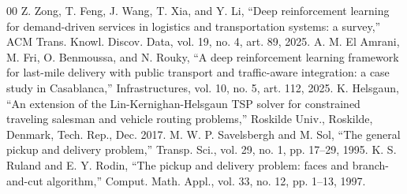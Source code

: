 \documentclass[conference]{IEEEtran}
\begin{document}
\begin{thebibliography}{00}
 Z. Zong, T. Feng, J. Wang, T. Xia, and Y. Li, ``Deep reinforcement learning for demand-driven services in logistics and transportation systems: a survey,'' ACM Trans. Knowl. Discov. Data, vol. 19, no. 4, art. 89, 2025.
 A. M. El Amrani, M. Fri, O. Benmoussa, and N. Rouky, ``A deep reinforcement learning framework for last-mile delivery with public transport and traffic-aware integration: a case study in Casablanca,'' Infrastructures, vol. 10, no. 5, art. 112, 2025.
 K. Helsgaun, ``An extension of the Lin-Kernighan-Helsgaun TSP solver for constrained traveling salesman and vehicle routing problems,'' Roskilde Univ., Roskilde, Denmark, Tech. Rep., Dec. 2017.
 M. W. P. Savelsbergh and M. Sol, ``The general pickup and delivery problem,'' Transp. Sci., vol. 29, no. 1, pp. 17--29, 1995.
 K. S. Ruland and E. Y. Rodin, ``The pickup and delivery problem: faces and branch-and-cut algorithm,'' Comput. Math. Appl., vol. 33, no. 12, pp. 1--13, 1997.
\end{thebibliography}
\end{document}
